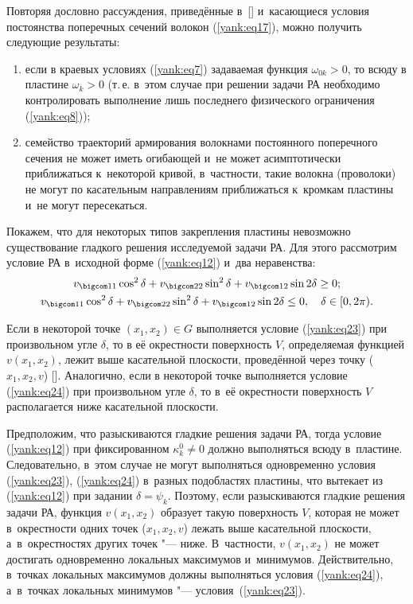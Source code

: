 Повторяя дословно рассуждения, приведённые в~[] и~касающиеся условия постоянства поперечных сечений волокон (\ref{yank:eq17}), можно получить следующие результаты:
\begin{enumerate}
\item если в краевых условиях (\ref{yank:eq7}) задаваемая функция $\omega_{0k}>0$, то всюду в пластине $\omega_k >0$ (т.\,е. в~этом случае при решении задачи РА необходимо контролировать выполнение лишь последнего физического ограничения (\ref{yank:eq8}));
\item семейство траекторий армирования волокнами постоянного поперечного сечения не может иметь огибающей и~не может
асимптотически приближаться к~некоторой кривой, в~частности, такие волокна (проволоки) не могут по касательным направлениям приближаться к~кромкам пластины и~не могут пересекаться.
\end{enumerate}

Покажем, что для некоторых типов закрепления пластины невозможно существование гладкого решения исследуемой задачи РА. 
Для этого рассмотрим условие РА в~исходной форме (\ref{yank:eq12}) и~два неравенства: 
\begin{gather} \label{yank:eq23}
v_{\bigcom 11} \cos^2 \delta +v_{\bigcom 22} \sin^2 \delta +v_{\bigcom 12} \sin 2\delta \ge
0;
\\
 \label{yank:eq24}
v_{\bigcom 11} \cos^2 \delta +v_{\bigcom 22} \sin^2 \delta +v_{\bigcom 12} \sin 2\delta \le 0,\quad \delta \in [0,2\pi).
\end{gather}

Если в некоторой точке $(x_1 , x_2  )\in G$ выполняется условие (\ref{yank:eq23}) при произвольном угле $\delta $, то в её окрестности поверхность $V$, определяемая функцией $v(x_1 , x_2 )$, лежит выше касательной плоскости, проведённой через точку ($x_1 , x_2 ,v$) []. 
Аналогично, если в некоторой точке выполняется условие (\ref{yank:eq24}) при произвольном угле $\delta $, то в~её окрестности
поверхность $V$ располагается ниже касательной плоскости.

Предположим, что разыскиваются гладкие решения задачи РА, тогда условие (\ref{yank:eq12}) при фиксированном $\kappa_k^0 \neq0$ должно выполняться всюду в~пластине.
Следовательно, в~этом случае не могут выполняться одновременно условия (\ref{yank:eq23}), (\ref{yank:eq24}) в~разных подобластях пластины, что вытекает из (\ref{yank:eq12}) при задании $\delta=\psi_k $. 
Поэтому, если разыскиваются гладкие решения задачи РА, функция $v(x_1 , x_2 )$ образует такую
поверхность $V$, которая не может в~окрестности одних точек ($x_1 , x_2 ,v$) лежать выше касательной плоскости, а~в~окрестностях других точек "--- ниже. 
В~частности, $v(x_1 , x_2 )$ не может достигать одновременно локальных максимумов и~минимумов. 
Действительно, в~точках локальных максимумов должны выполняться условия (\ref{yank:eq24}), а~в~точках локальных минимумов "--- условия~(\ref{yank:eq23}).


